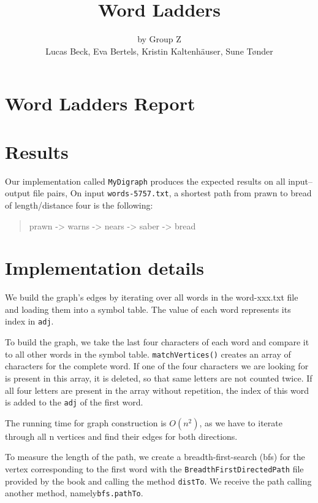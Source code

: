 \documentclass{tufte-handout}
\title{Word Ladders}
\author{by Group Z\\ Lucas Beck, Eva Bertels, Kristin Kaltenh\"{a}user, Sune T\o nder}
\begin{document}
\maketitle

\section{Word Ladders Report}

\section{Results}
  Our implementation called \texttt{MyDigraph} produces the expected results on all input--output file pairs, 
  On input {\tt words-5757.txt}, a shortest path from prawn to bread of length/distance four is the following:
  \begin{quotation}
     prawn -> warns -> nears ->  saber -> bread 
  \end{quotation}

  \section{Implementation details}

  We build the graph's edges by iterating over all words in the word-xxx.txt file and loading them into a symbol table.
  The value of each word represents its index in \texttt{adj}.
  
  To build the graph, we take the last four characters of each word and compare it to all other words in the symbol table.
  \texttt{matchVertices()} creates an array of characters for the complete word.
  If one of the four characters we are looking for is present in this array, it is deleted, so that same letters are not counted twice.
  If all four letters are present in the array without repetition, the index of this word is added to the \texttt{adj} of the first word.  
  
  The running time for graph construction is $O(n^2)$,
  as we have to iterate through all n vertices and find    their edges for both directions.
    
    
   
  To measure the length of the path, we create a breadth-first-search (bfs) for the vertex corresponding to the first word with the \texttt{BreadthFirstDirectedPath} file provided by the book and calling the method \texttt{distTo}.
 We receive the path calling another method, namely\texttt{bfs.pathTo}.
\end{document}
